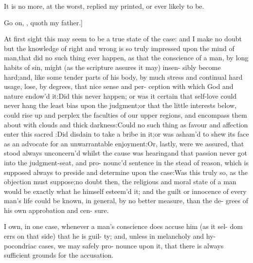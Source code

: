 \documentclass[twoside]{article}
\begin{document}
It is no more, at the worst, replied my
printed, or ever likely to be.

Go on, \trim, quoth my father.]

\lqq At first sight this may seem to be a\break
\lqq true state of the case: and I make no\break
\lqq doubt but the knowledge of right and\break
\lqq wrong is so truly impressed upon the\break
\lqq mind of man,\tsk that did no such thing\break
\lqq ever happen, as that the conscience of\break
\lqq a man, by long habits of sin, might\break
\lqq (as the scripture assures it may) insen-\break
\lqq sibly become hard;\tsk and, like some\break
\lqq tender parts of his body, by much\break
\lqq stress and continual hard usage, lose,\break
\lqq by degrees, that nice sense and per-\break
\lqq ception with which God and nature\break 
\lqq endow’d it:\tsk Did this never happen;\break
\lqq \tsk or was it certain that self-love could\break
\lqq never hang the least bias upon the\break 
\lqq judgment;\tsk or that the little interests\break 
\lqq below, could rise up and perplex the\break
\lqq faculties of our upper regions, and
\lqq encompass them about with clouds and\break
\lqq thick darkness:\tsh Could no such\break
\lqq thing as favour and affection enter this\break
\lqq sacred :\tsk  Did  disdain to\break
\lqq take a bribe in it;\tsk or was asham’d to\break
\lqq shew its face as an advocate for an\break
\lqq unwarrantable enjoyment:\tsk Or, lastly,\break
\lqq were we assured, that  stood\break
\lqq always unconcern’d whilst the cause\break
\lqq was hearing\tsk and that passion never\break
\lqq got into the judgment-seat, and pro-\break
\lqq nounc’d sentence in the stead of reason,\break
\lqq which is supposed always to preside\break
\lqq and determine upon the case:\tsk Was\break
\lqq this truly so, as the objection must\break
\lqq suppose;\tsk no doubt then, the religious\break
\lqq and moral state of a man would be\break
\lqq exactly what he himself esteem’d it;\tsk\break
\lqq and the guilt or innocence of every\break
\lqq man’s life could be known, in general,\break
\lqq by no better measure, than the de-
\lqq grees of his own approbation and cen-\break
\lqq sure.

\lqq I own, in one case, whenever a man’s\break
\lqq conscience does accuse him (as it sel-\break
\lqq dom errs on that side) that he is guil-\break
\lqq ty; and, unless in melancholy and hy-\break
\lqq pocondriac cases, we may safely pro-\break
\lqq nounce upon it, that there is always\break
\lqq sufficient grounds for the accusation.
\end{document}
